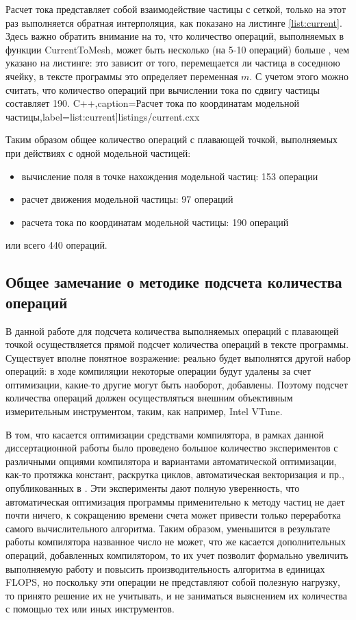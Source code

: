 Расчет тока представляет собой взаимодействие частицы с сеткой, только на этот раз выполняется обратная интерполяция, как показано на листинге \ref{list:current}. Здесь важно обратить внимание на то, что количество операций, выполняемых в функции CurrentToMesh, может быть несколько (на 5-10 операций) больше , чем указано на листинге: это зависит от того, перемещается ли частица в соседнюю ячейку, в тексте программы это определяет переменная $m$. С учетом этого можно считать, что количество операций при вычислении тока по сдвигу частицы составляет 190.
\begingroup
\captiondelim{ } %
C++},caption={Расчет тока по координатам модельной частицы},label={list:current}]{listings/current.cxx}
\endgroup  

Таким образом общее количество операций с плавающей точкой, выполняемых при действиях с одной модельной частицей:
\begin{itemize}
	\item вычисление поля в точке нахождения модельной частиц: 153 операции
	\item расчет движения модельной частицы: 97 операций
	\item расчета тока по координатам модельной частицы: 190 операций
\end{itemize} 
или всего 440 операций.

\subsection{Общее замечание о методике подсчета количества операций}

В данной работе для подсчета количества выполняемых операций с плавающей точкой осуществляется прямой подсчет количества операций в тексте программы. Существует вполне понятное возражение: реально будет выполнятся другой набор операций: в ходе компиляции некоторые операции будут удалены за счет оптимизации, какие-то другие могут быть наоборот, добавлены. Поэтому подсчет количества операций должен осуществляться внешним объективным измерительным инструментом, таким, как например, Intel VTune.  

В том, что касается оптимизации средствами компилятора, в рамках данной диссертационной работы было проведено большое количество экспериментов с различными опциями компилятора и вариантами автоматической оптимизации, как-то протяжка констант, раскрутка циклов, автоматическая векторизация и пр., опубликованных в \cite{MohographyTarkov,MatMod,VychMethProgExa}. Эти эксперименты дают полную уверенность, что автоматическая оптимизация программы применительно к методу частиц не дает почти ничего, к сокращению времени счета может привести только переработка самого вычислительного алгоритма. Таким образом, уменьшится в результате работы компилятора названное число не может, что же касается дополнительных операций, добавленных компилятором, то их учет позволит формально увеличить выполняемую работу и повысить производительность алгоритма в единицах FLOPS, но поскольку эти операции не представляют собой полезную нагрузку, то принято решение их не учитывать, и не заниматься выяснением их количества с помощью тех или иных инструментов.    	  

